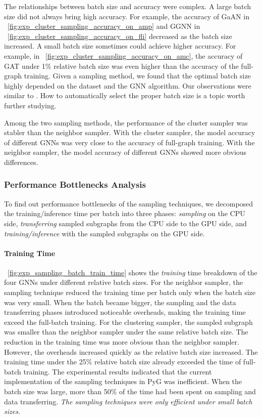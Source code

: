 The relationships between batch size and accuracy were complex.
%
A large batch size did not always bring high accuracy.
%
For example, the accuracy of GaAN in \figurename~\ref{fig:exp_cluster_sampling_accuracy_on_amp} and GGNN in \figurename~\ref{fig:exp_cluster_sampling_accuracy_on_fli} decreased as the batch size increased.
%
A small batch size sometimes could achieve higher accuracy.
%
For example, in \figurename~\ref{fig:exp_cluster_sampling_accuracy_on_amc}, the accuracy of GAT under 1\% relative batch size was even higher than the accuracy of the full-graph training.
%
Given a sampling method, we found that the optimal batch size highly depended on the dataset and the GNN algorithm.
%
Our observations were similar to \cite{zeng2020_graphsaint}.
%
How to automatically select the proper batch size is a topic worth further studying.

Among the two sampling methods, the performance of the cluster sampler was stabler than the neighbor sampler.
%
With the cluster sampler, the model accuracy of different GNNs was very close to the accuracy of full-graph training.
%
With the neighbor sampler, the model accuracy of different GNNs showed more obvious differences.

\subsubsection{Performance Bottlenecks Analysis}

To find out performance bottlenecks of the sampling techniques, we decomposed the training/inference time per batch into three phases: \emph{sampling} on the CPU side, \emph{transferring} sampled subgraphs from the CPU side to the GPU side, and \emph{training/inference} with the sampled subgraphs on the GPU side.

\paragraph{Training Time}

\figurename~\ref{fig:exp_sampling_batch_train_time} shows the \emph{training} time breakdown of the four GNNs under different relative batch sizes.
%
For the neighbor sampler, the sampling technique reduced the training time per batch only when the batch size was very small.
%
When the batch became bigger, the sampling and the data transferring phases introduced noticeable overheads, making the training time exceed the full-batch training.
%
For the clustering sampler, the sampled subgraph was smaller than the neighbor sampler under the same relative batch size.
%
The reduction in the training time was more obvious than the neighbor sampler.
%
However, the overheads increased quickly as the relative batch size increased.
%
The training time under the 25\% relative batch size already exceeded the time of full-batch training.
%
The experimental results indicated that the current implementation of the sampling techniques in PyG was inefficient.
%
When the batch size was large, more than 50\% of the time had been spent on sampling and data transferring.
%
\emph{The sampling techniques were only efficient under small batch sizes.}


